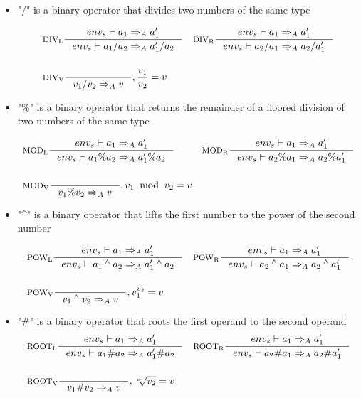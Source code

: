 \begin{itemize}
\item "/" is a binary operator that divides two numbers of the same type

\begin{align*}
&\inference[$\text{DIV}_\text{L}$]{env_s\vdash a_1 \Rightarrow_A a_1'}
                    {env_s\vdash a_1 / a_2 \Rightarrow_A a_1' / a_2}
&
&\inference[$\text{DIV}_\text{R}$]{env_s\vdash a_1 \Rightarrow_A a_1'}
                    {env_s\vdash a_2 / a_1 \Rightarrow_A a_2 / a_1'}
\\\\
&\inference[$\text{DIV}_\text{V}$]{}
                    {v_1 / v_2 \Rightarrow_A v}
                    {, \frac{v_1}{v_2} = v}
\end{align*}

\item "\%" is a binary operator that returns the remainder of a floored division of two numbers of the same type

\begin{align*}
&\inference[$\text{MOD}_\text{L}$]{env_s\vdash a_1 \Rightarrow_A a_1'}
                    {env_s\vdash a_1 \% a_2 \Rightarrow_A a_1' \% a_2}
&
&\inference[$\text{MOD}_\text{R}$]{env_s\vdash a_1 \Rightarrow_A a_1'}
                    {env_s\vdash a_2 \% a_1 \Rightarrow_A a_2 \% a_1'}
\\\\
&\inference[$\text{MOD}_\text{V}$]{}
                    {v_1 \% v_2 \Rightarrow_A v}
                    {, v_1 \;\; \textrm{mod} \;\; v_2 = v}
\end{align*}

\item "\^{}" is a binary operator that lifts the first number to the power of the second number

\begin{align*}
&\inference[$\text{POW}_\text{L}$]{env_s\vdash a_1  \Rightarrow_A a_1'}
                    {env_s\vdash a_1 \Twedge a_2 \Rightarrow_A a_1' \Twedge a_2}
&
&\inference[$\text{POW}_\text{R}$]{env_s\vdash a_1 \Rightarrow_A a_1'}
                    {env_s\vdash a_2 \Twedge a_1 \Rightarrow_A a_2 \Twedge a_1'}
\\\\
&\inference[$\text{POW}_\text{V}$]{}
                    {v_1 \Twedge v_2 \Rightarrow_A v}
                    {, v_1 ^ {v_2} = v}
\end{align*}

\item "\#" is a binary operator that roots the first operand to the second operand
\begin{align*}
&\inference[$\text{ROOT}_\text{L}$]{env_s\vdash a_1 \Rightarrow_A a_1'}
                    {env_s\vdash a_1 \# a_2 \Rightarrow_A a_1' \# a_2}
&
&\inference[$\text{ROOT}_\text{R}$]{env_s\vdash a_1 \Rightarrow_A a_1'}
                    {env_s\vdash a_2 \# a_1 \Rightarrow_A a_2 \# a_1'}
\\\\
&\inference[$\text{ROOT}_\text{V}$]{}
                    {v_1 \# v_2 \Rightarrow_A v}
                    {, \sqrt[v_1]{v_2} = v}
\end{align*}


\end{itemize}
